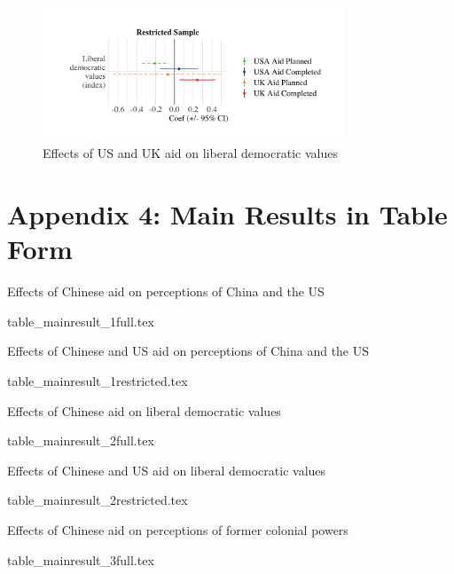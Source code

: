 \documentclass[9pt]{article}
\begin{document}
\begin{figure}[H]
\centering
\includegraphics[width=0.8\textwidth]{figures/figure_a21.png}
\caption{Effects of US and UK aid on liberal democratic values}
\end{figure}

\newpage
\section{Appendix 4: Main Results in Table Form}

\setlength{\tabcolsep}{5pt}
\begin{table}[H]
\caption{Effects of Chinese aid on perceptions of China and the US}
\label{reg}
\centering
{table_mainresult_1full.tex}
\end{table}

\setlength{\tabcolsep}{5pt}
\begin{table}[H]
\caption{Effects of Chinese and US aid on perceptions of China and the US}
\label{reg}
\centering
{table_mainresult_1restricted.tex}
\end{table}

\newpage %

\setlength{\tabcolsep}{5pt}
\begin{table}[H]
\caption{Effects of Chinese aid on liberal democratic values}
\label{reg}
\centering
{table_mainresult_2full.tex}
\end{table}

\setlength{\tabcolsep}{5pt}
\begin{table}[H]
\caption{Effects of Chinese and US aid on liberal democratic values}
\label{reg}
\centering
{table_mainresult_2restricted.tex}
\end{table}

\newpage %

\setlength{\tabcolsep}{5pt}
\begin{table}[H]
\caption{Effects of Chinese aid on perceptions of former colonial powers}
\label{reg}
\centering
{table_mainresult_3full.tex}
\end{table}
\end{document}
